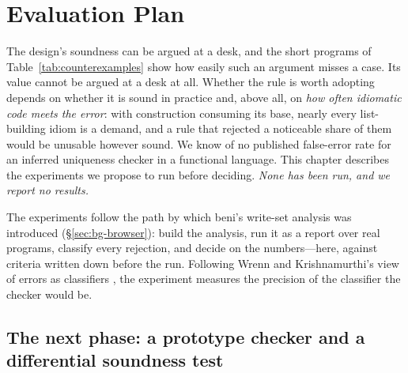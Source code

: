 \chapter{Evaluation Plan}
\label{sec:evaluation}

The design's soundness can be argued at a desk, and the short programs of
Table~\ref{tab:counterexamples} show how easily such an argument misses a case. Its value cannot be argued
at a desk at all. Whether the rule is worth adopting depends on whether it is sound in practice and, above
all, on \emph{how often idiomatic code meets the error}: with construction consuming its base, nearly every
list-building idiom is a demand, and a rule that rejected a noticeable share of them would be unusable
however sound. We know of no published false-error rate for an inferred uniqueness checker in a functional
language. This chapter describes the experiments we propose to run before deciding. \emph{None has been
run, and we report no results.}

The experiments follow the path by which beni's write-set analysis was introduced
(\S\ref{sec:bg-browser}): build the analysis, run it as a report over real programs, classify every
rejection, and decide on the numbers---here, against criteria written down before the run. Following
Wrenn and Krishnamurthi's view of errors as classifiers \citep[\S2]{wrenn2017classifiers}, the experiment
measures the precision of the classifier the checker would be.

\section{The next phase: a prototype checker and a differential soundness test}
\label{sec:eval-next}

